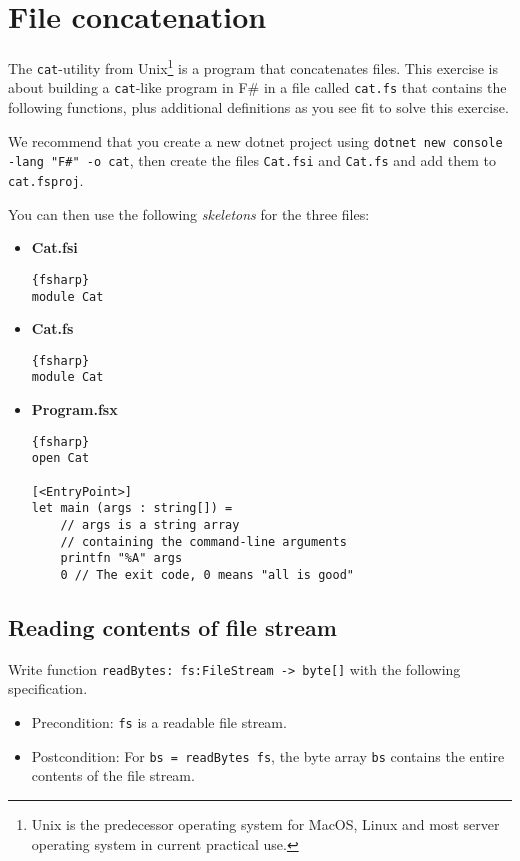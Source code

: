 \section*{File concatenation}

The \texttt{cat}-utility from 
Unix\footnote{Unix is the predecessor operating system for MacOS, Linux and most server operating system in current practical use.} 
is a program that concatenates files.  
This exercise is about building a \texttt{cat}-like program in F\# in a file called \texttt{cat.fs} that contains the following functions, plus additional definitions as you see fit to solve this exercise.

We recommend that you create a new dotnet project using \texttt{dotnet new console -lang "F\#" -o cat}, then create the files \texttt{Cat.fsi} and \texttt{Cat.fs} and add them to \texttt{cat.fsproj}.


You can then use the following \textit{skeletons} for the three files:

\begin{itemize}
\item \textbf{Cat.fsi} \\
  \begin{lstlisting}{fsharp}
module Cat
  \end{lstlisting}
\item \textbf{Cat.fs} \\
  \begin{lstlisting}{fsharp}
module Cat
  \end{lstlisting}
\item \textbf{Program.fsx} \\
  \begin{lstlisting}{fsharp}
open Cat

[<EntryPoint>]
let main (args : string[]) =
    // args is a string array
    // containing the command-line arguments
    printfn "%A" args 
    0 // The exit code, 0 means "all is good"
  \end{lstlisting}
\end{itemize}



\subsection*{Reading contents of file stream}

Write function \texttt{readBytes: fs:FileStream -> byte[]} with the following specification.  
\begin{itemize}
\item Precondition: \texttt{fs} is a readable file stream.
\item Postcondition: For \texttt{bs = readBytes fs}, the byte array \texttt{bs} contains the entire contents of the file stream.   
\end{itemize}

